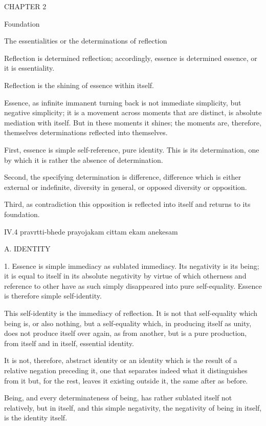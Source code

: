 CHAPTER 2

Foundation

The essentialities or the determinations of reflection

Reflection is determined reflection;
accordingly, essence is determined essence, or it is essentiality.

Reflection is the shining of essence within itself.

Essence, as infinite immanent turning back is
not immediate simplicity, but negative simplicity;
it is a movement across moments that are distinct,
is absolute mediation with itself.
But in these moments it shines;
the moments are, therefore, themselves
determinations reflected into themselves.

First, essence is simple self-reference, pure identity.
This is its determination, one by which it is rather
the absence of determination.

Second, the specifying determination is difference,
difference which is either external or indefinite,
diversity in general, or opposed diversity or opposition.

Third, as contradiction this opposition is reflected into itself
and returns to its foundation.

IV.4
pravrtti-bhede prayojakam cittam ekam anekesam

A. IDENTITY

1. Essence is simple immediacy as sublated immediacy.
Its negativity is its being;
it is equal to itself in its absolute negativity
by virtue of which otherness and reference to other
have as such simply disappeared into pure self-equality.
Essence is therefore simple self-identity.

This self-identity is the immediacy of reflection.
It is not that self-equality which being is, or also nothing,
but a self-equality which, in producing itself as unity,
does not produce itself over again, as from another,
but is a pure production, from itself and in itself,
essential identity.

It is not, therefore, abstract identity
or an identity which is the result
of a relative negation preceding it,
one that separates indeed
what it distinguishes from it
but, for the rest, leaves it existing outside it,
the same after as before.

Being, and every determinateness of being,
has rather sublated itself not relatively,
but in itself, and this simple negativity,
the negativity of being in itself,
is the identity itself.

